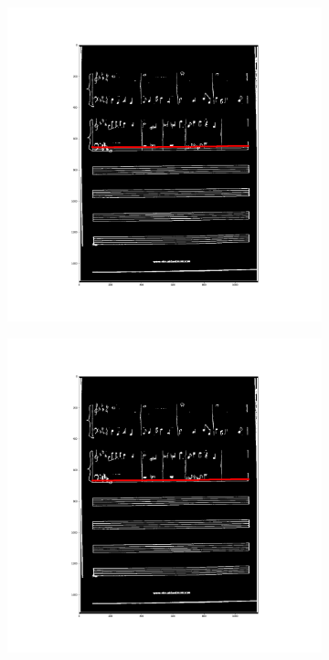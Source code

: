 \documentclass[12pt]{article}
\begin{document}
\begin{figure}[h!]
\begin{subfigure}[b]{0.32\linewidth}
		\end{subfigure}
		\begin{subfigure}[b]{0.32\linewidth}
			\includegraphics[width=\linewidth]{zdj/BFS18.png}
		\end{subfigure}
		\begin{subfigure}[b]{0.32\linewidth}
			\includegraphics[width=\linewidth]{zdj/BFS19.png}

\end{subfigure}
\end{figure}
\end{document}
